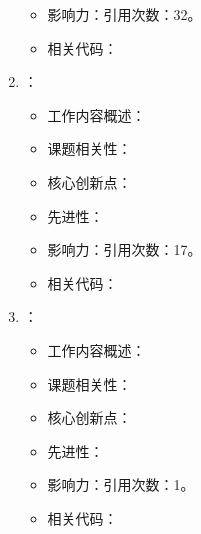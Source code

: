 \begin{enumerate}
\begin{itemize}
                \item 影响力：引用次数：32。
                \item 相关代码：
            \end{itemize}
        \item \citet{hibat2021variational}：
            \begin{itemize}
                \item 工作内容概述：
                \item 课题相关性：
                \item 核心创新点：
                \item 先进性：
                \item 影响力：引用次数：17。
                \item 相关代码：
            \end{itemize}
            \item \citet{inack2022neural}：
            \begin{itemize}
                \item 工作内容概述：
                \item 课题相关性：
                \item 核心创新点：
                \item 先进性：
                \item 影响力：引用次数：1。
                \item 相关代码：
            \end{itemize}
\end{enumerate}
